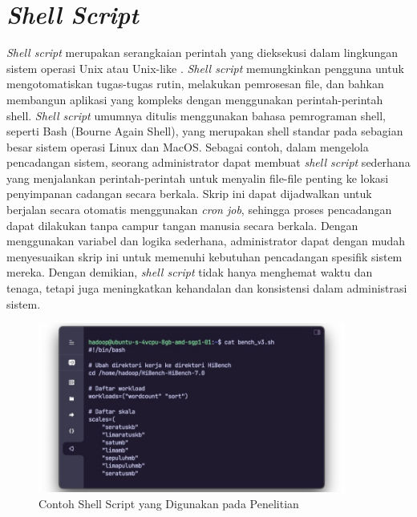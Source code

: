 \section{\textit{Shell Script}}
\textit{Shell script} merupakan serangkaian perintah yang dieksekusi dalam lingkungan sistem operasi Unix atau Unix-like \cite{newhamLearningBashShell2005}. \textit{Shell script} memungkinkan pengguna untuk mengotomatiskan tugas-tugas rutin, melakukan pemrosesan file, dan bahkan membangun aplikasi yang kompleks dengan menggunakan perintah-perintah shell. \textit{Shell script} umumnya ditulis menggunakan bahasa pemrograman shell, seperti Bash (Bourne Again Shell), yang merupakan shell standar pada sebagian besar sistem operasi Linux dan MacOS.
Sebagai contoh, dalam mengelola pencadangan sistem, seorang administrator dapat membuat \textit{shell script} sederhana yang menjalankan perintah-perintah untuk menyalin file-file penting ke lokasi penyimpanan cadangan secara berkala. Skrip ini dapat dijadwalkan untuk berjalan secara otomatis menggunakan \textit{cron job}, sehingga proses pencadangan dapat dilakukan tanpa campur tangan manusia secara berkala. Dengan menggunakan variabel dan logika sederhana, administrator dapat dengan mudah menyesuaikan skrip ini untuk memenuhi kebutuhan pencadangan spesifik sistem mereka. Dengan demikian, \textit{shell script} tidak hanya menghemat waktu dan tenaga, tetapi juga meningkatkan kehandalan dan konsistensi dalam administrasi sistem.

\begin{figure}[h]
    \centering
    \includegraphics[width=0.9\textwidth]{figures/ch02/contoh-bash}
    \caption{Contoh Shell Script yang Digunakan pada Penelitian}
    \label{fig:contoh-bash}
\end{figure}


